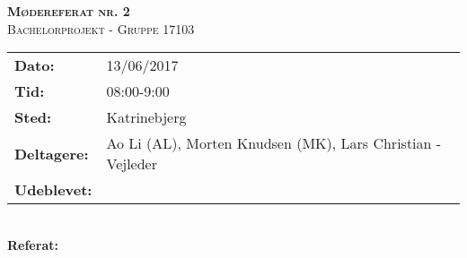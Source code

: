 
\newcommand{\HRule}{\rule{\linewidth}{0.1mm}}


	\begin{center}
		{\huge \bfseries \textsc{Mødereferat nr. 2}}\\
		\textsc{\large Bachelorprojekt - Gruppe 17103}\\[0.3cm]
	\end{center}
	\begin{tabular}{ll}
	\large \textbf{Dato:} & 13/06/2017  	\\ %
	\large \textbf{Tid:}  & 08:00-9:00 	\\ %
	\large \textbf{Sted:} & Katrinebjerg		\\ %
	\large \textbf{Deltagere:} & Ao Li (AL), Morten Knudsen (MK), Lars Christian - Vejleder \\
	\large \textbf{Udeblevet:}
	\end{tabular}\\
	\phantom{\,}\hspace{0.1em} \large \textbf{Referat:}

